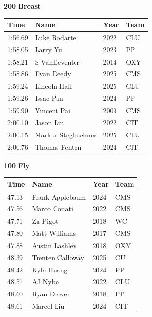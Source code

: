 \vspace{1.2em}
\noindent\begin{minipage}[t]{0.98\textwidth}
\centering
\textbf{\textcolor{teamprimary}{200 Breast}}\par
\vspace{0.5em}
\centering
\small
\renewcommand{\arraystretch}{1.0}
\setlength{\tabcolsep}{4pt}
\begin{tabular}{@{}p{2.5cm}p{4.5cm}p{1.5cm}p{2.5cm}@{}}
\toprule
\textbf{Time} & \textbf{Name} & \textbf{Year} & \textbf{Team} \\
\midrule
1:56.69 & Luke Rodarte & 2022 & CLU \\
1:58.05 & Larry Yu & 2023 & PP \\
1:58.21 & S VanDeventer & 2014 & OXY \\
1:58.86 & Evan Deedy & 2025 & CMS \\
1:59.24 & Lincoln Hall & 2025 & CLU \\
1:59.26 & Issac Pan & 2024 & PP \\
1:59.90 & Vincent Pai & 2009 & CMS \\
2:00.10 & Jason Lin & 2022 & CIT \\
2:00.15 & Markus Stegbuchner & 2025 & CLU \\
2:00.76 & Thomas Fenton & 2024 & CIT \\
\bottomrule
\end{tabular}
\end{minipage}
\vspace{1.2em}
\noindent\begin{minipage}[t]{0.98\textwidth}
\centering
\textbf{\textcolor{teamprimary}{100 Fly}}\par
\vspace{0.5em}
\centering
\small
\renewcommand{\arraystretch}{1.0}
\setlength{\tabcolsep}{4pt}
\begin{tabular}{@{}p{2.5cm}p{4.5cm}p{1.5cm}p{2.5cm}@{}}
\toprule
\textbf{Time} & \textbf{Name} & \textbf{Year} & \textbf{Team} \\
\midrule
47.13 & Frank Applebaum & 2024 & CMS \\
47.56 & Marco Conati & 2022 & CMS \\
47.71 & Zu Pigot & 2018 & WC \\
47.80 & Matt Williams & 2017 & CMS \\
47.88 & Austin Lashley & 2018 & OXY \\
48.39 & Trenten Calloway & 2025 & CU \\
48.42 & Kyle Huang & 2024 & PP \\
48.51 & AJ Nybo & 2022 & CLU \\
48.60 & Ryan Drover & 2018 & PP \\
48.61 & Marcel Liu & 2024 & CIT \\
\bottomrule
\end{tabular}
\end{minipage}
